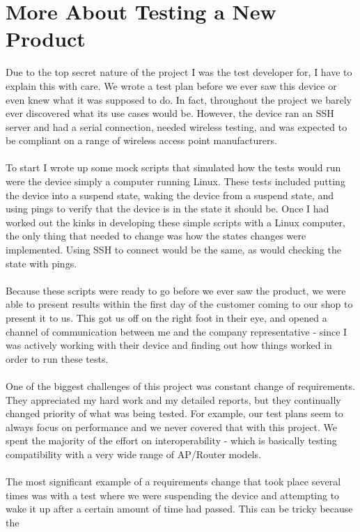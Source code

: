 \documentclass{article}
\begin{document}
\section*{More About Testing a New Product}
Due to the top secret nature of the project I was the test developer for, I have
to explain this with care. We wrote a test plan before we ever saw this device
or even knew what it was supposed to do. In fact, throughout the project we
barely ever discovered what its use cases would be. However, the device ran an
SSH server and had a serial connection, needed wireless testing, and was
expected to be compliant on a range of wireless access point manufacturers.\\
\\
To start I wrote up some mock scripts that simulated how the tests would
run were the device simply a computer running Linux. These tests included
putting the device into a suspend state, waking the device from a
suspend state, and using pings to verify that the device is in the state it
should be. Once I had worked out the kinks in developing these simple scripts
with a Linux computer, the only thing that needed to change was how the states
changes were implemented. Using SSH to connect would be the same, as would 
checking the state with pings.\\
\\
Because these scripts were ready to go before we ever saw the product, we were
able to present results within the first day of the customer coming to our shop
to present it to us. This got us off on the right foot in their eye, and opened
a channel of communication between me and the company representative - since I
was actively working with their device and finding out how things worked in
order to run these tests.\\
\\
One of the biggest challenges of this project was constant change of 
requirements. They appreciated my hard work and my detailed reports, but they
continually changed priority of what was being tested. For example, our test
plans seem to always focus on performance and we never covered that with this
project. We spent the majority of the effort on interoperability - which is
basically testing compatibility with a very wide range of AP/Router models.\\
\\
The most significant example of a requirements change that took place several
times was with a test where we were suspending the device and attempting to wake
it up after a certain amount of time had passed. This can be tricky because the
\end{document}
